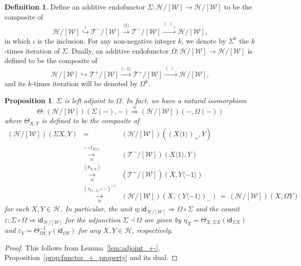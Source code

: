 \documentclass[a4paper,reqno,10pt]{amsart}
\newtheorem{proposition}[proposition]{Proposition}
\theoremstyle{definition}
\newtheorem{definition}[definition]{Definition}
\theoremstyle{definition}
\theoremstyle{definition}
\theoremstyle{definition}
\theoremstyle{plain}
\newcommand{\id}{\mathsf{id}}
\newcommand{\CH}{\mathcal{H}}
\newcommand{\CT}{\mathcal{T}}
\newcommand{\CW}{\mathcal{W}}
\begin{document}
\begin{definition}\label{def:functor_Sigma}
Define an additive endofunctor $\Sigma\colon\CH/[\CW]\to\CH/[\CW]$ to be the composite of
\[
\CH/[\CW]\overset{\iota}{\hookrightarrow}\CT^-/[\CW]\xrightarrow{\langle 1\rangle}\CT^-/[\CW]\xrightarrow{(\ )_+}\CH/[\CW],
\]
in which $\iota$ is the inclusion. For any non-negative integer $k$, we denote by $\Sigma^k$ the $k$-times iteration of $\Sigma$.
Dually, an additive endofunctor $\Omega\colon\CH/[\CW]\to\CH/[\CW]$ is defined to be the composite of
\[
\CH/[\CW]\hookrightarrow\CT^+/[\CW]\xrightarrow{\langle -1\rangle}\CT^+/[\CW]\xrightarrow{(\ )_-}\CH/[\CW],
\]
and its $k$-times iteration will be denoted by $\Omega^k$.
\end{definition}

\begin{proposition}\label{prop:adjoint_Sigma_Omega}
$\Sigma$ is left adjoint to $\Omega$.
In fact, we have a natural isomorphism
\[
\Theta\colon(\CH/[\CW])(\Sigma(-),-)\overset{\cong}{\Longrightarrow}(\CH/[\CW])(-,\Omega(-))
\]
where $\Theta_{X,Y}$ is defined to be the composite of
\begin{eqnarray*}
(\CH/[\CW])(\Sigma X,Y)&=&(\CH/[\CW])((X\langle1\rangle)_+,Y)\\
&\underset{\cong}{\xrightarrow{-\circ\overline{l_{X\langle1\rangle}}}}&
(\CT^-/[\CW])(X\langle1\rangle,Y)\\
&\underset{\cong}{\xrightarrow{(\theta_{X,Y})}}&(\CT^+/[\CW])(X,Y\langle-1\rangle)\\
&\underset{\cong}{\xrightarrow{(\overline{r_{Y\langle-1\rangle}}\circ-)^{-1}}}&(\CH/[\CW])(X,(Y\langle-1\rangle)_-)\, =\, (\CH/[\CW])(X,\Omega Y)
\end{eqnarray*}
for each $X,Y\in\CH$. In particular, the unit $\eta\colon\id_{\CH/[\CW]}\Rightarrow\Omega\circ \Sigma$ and the counit $\varepsilon\colon\Sigma\circ\Omega\Rightarrow\id_{\CH/[\CW]}$ for the adjunction $\Sigma\dashv\Omega$ are given by
$\eta_X=\Theta_{X,\Sigma X}(\id_{\Sigma X})$ and 
$\varepsilon_Y=\Theta_{\Omega Y,Y}^{-1}(\id_{\Omega Y})$ for any $X,Y\in\CH$, respectively.
\normalcolor
\end{proposition}
\begin{proof}
This follows from Lemma~\ref{lem:adjoint_+-}, Proposition~\ref{prop:functor_+_property} and its dual.
\normalcolor
\end{proof}
\end{document}
